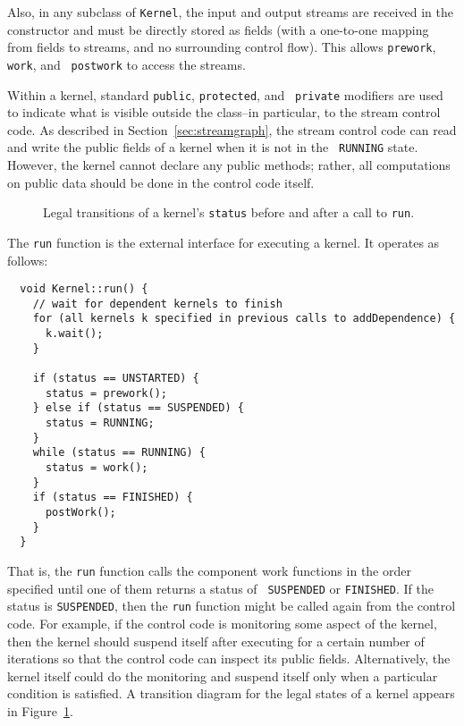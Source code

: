 Also, in any subclass of {\tt Kernel}, the input and output streams
are received in the constructor and must be directly stored as fields
(with a one-to-one mapping from fields to streams, and no surrounding
control flow).  This allows {\tt prework}, {\tt work}, and {\tt
postwork} to access the streams.

Within a kernel, standard {\tt public}, {\tt protected}, and {\tt
private} modifiers are used to indicate what is visible outside the
class--in particular, to the stream control code.  As described in
Section~\ref{sec:streamgraph}, the stream control code can read and
write the public fields of a kernel when it is not in the {\tt
RUNNING} state.  However, the kernel cannot declare any public
methods; rather, all computations on public data should be done in the
control code itself.


\begin{figure}[t]
\begin{center}
\end{center}
\vspace{-12pt}
\caption{Legal transitions of a kernel's {\tt status} before and after
a call to {\tt run}.\protect\label{fig:kernel-status}}
\end{figure}

The {\tt run} function is the external interface for executing a
kernel.  It operates as follows: 
{\small
\begin{verbatim}
  void Kernel::run() {
    // wait for dependent kernels to finish
    for (all kernels k specified in previous calls to addDependence) {
      k.wait();
    }

    if (status == UNSTARTED) {
      status = prework();
    } else if (status == SUSPENDED) {
      status = RUNNING;
    }
    while (status == RUNNING) {
      status = work();
    }
    if (status == FINISHED) {
      postWork();
    }
  } 
\end{verbatim}}
That is, the {\tt run} function calls the component work functions in
the order specified until one of them returns a status of {\tt
SUSPENDED} or {\tt FINISHED}.  If the status is {\tt SUSPENDED}, then
the {\tt run} function might be called again from the control code.
For example, if the control code is monitoring some aspect of the
kernel, then the kernel should suspend itself after executing for a
certain number of iterations so that the control code can inspect its
public fields.  Alternatively, the kernel itself could do the
monitoring and suspend itself only when a particular condition is
satisfied.  A transition diagram for the legal states of a kernel
appears in Figure~\ref{fig:kernel-status}.


